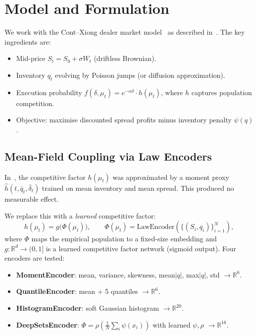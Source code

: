 \documentclass[11pt,a4paper]{article}
\newcommand{\R}{\mathbb{R}}
\newcommand{\mup}{\mu_t}
\begin{document}
\section{Model and Formulation}
\label{sec:model}

We work with the Cont--Xiong dealer market model~\cite{cont2024dynamics} as described in~\cite{garry2026preprint1}. The key ingredients are:
\begin{itemize}
  \item Mid-price $S_t = S_0 + \sigma W_t$ (driftless Brownian).
  \item Inventory $q_t$ evolving by Poisson jumps (or diffusion approximation).
  \item Execution probability $f(\delta, \mup) = e^{-\alpha\delta} \cdot h(\mup)$, where $h$ captures population competition.
  \item Objective: maximise discounted spread profits minus inventory penalty $\psi(q)$.
\end{itemize}

\subsection{Mean-Field Coupling via Law Encoders}

In~\cite{garry2026preprint1}, the competitive factor $h(\mup)$ was approximated by a moment proxy $\hat{h}(t, \bar{q}_t, \bar{\delta}_t)$ trained on mean inventory and mean spread. This produced no measurable effect.

We replace this with a \emph{learned} competitive factor:
\begin{equation}\label{eq:h_law}
  h(\mup) = g\bigl(\Phi(\mup)\bigr), \qquad \Phi(\mup) = \text{LawEncoder}(\{(S_i, q_i)\}_{i=1}^N),
\end{equation}
where $\Phi$ maps the empirical population to a fixed-size embedding and $g: \R^d \to (0, 1]$ is a learned competitive factor network (sigmoid output). Four encoders are tested:
\begin{itemize}
  \item \textbf{MomentEncoder}: mean, variance, skewness, mean$|q|$, max$|q|$, std $\to \R^6$.
  \item \textbf{QuantileEncoder}: mean + 5 quantiles $\to \R^6$.
  \item \textbf{HistogramEncoder}: soft Gaussian histogram $\to \R^{20}$.
  \item \textbf{DeepSetsEncoder}: $\Phi = \rho(\frac{1}{N}\sum_i \psi(x_i))$ with learned $\psi, \rho$ $\to \R^{16}$.
\end{itemize}
\end{document}

